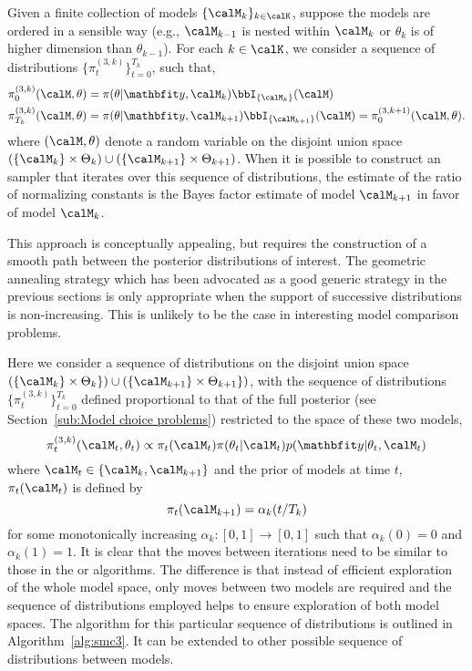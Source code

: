 Given a finite collection of models $\{\calM_k\}_{k\in\calK}$, suppose the models are ordered in a sensible way (e.g., $\calM_{k-1}$ is nested within $\calM_k$ or $\theta_k$ is of higher dimension than $\theta_{k-1}$). For each $k\in\calK$, we consider a sequence of distributions $\{\pi_t^{(3,k)}\}_{t=0}^{T_k}$, such that,
\begin{align*}
  \pi_0^{(3,k)}(\calM,\theta) &=
  \pi(\theta|\data,\calM_k) \bbI_{\{\calM_k\}}(\calM) \\
  \pi_{T_k}^{(3,k)}(\calM,\theta) &=
  \pi(\theta|\data,\calM_{k+1})
  \bbI_{\{\calM_{k+1}\}}(\calM) = \pi_{0}^{(3,k+1)}(\calM,\theta).
\end{align*}
where $(\calM,\theta)$ denote a random variable on the disjoint union space $(\{\calM_k\}\times\Theta_k)\cup(\{\calM_{k+1}\}\times\Theta_{k+1})$. When it is possible to construct an \smc sampler that iterates over this sequence of distributions, the estimate of the ratio of normalizing constants is the Bayes factor estimate of model $\calM_{k+1}$ in favor of model $\calM_k$.

This approach is conceptually appealing, but requires the construction of a smooth path between the posterior distributions of interest. The geometric annealing strategy which has been advocated as a good generic strategy in the previous sections is only appropriate when the support of successive distributions is non-increasing. This is unlikely to be the case in interesting model comparison problems.

Here we consider a sequence of distributions on the disjoint union space $(\{\calM_k\}\times\Theta_k\})\cup(\{\calM_{k+1}\}\times\Theta_{k+1}\})$, with the sequence of distributions $\{\pi_t^{(3,k)}\}_{t=0}^{T_k}$ defined proportional to that of the full posterior (see Section~\ref{sub:Model choice problems}) restricted to the space of these two models,
\begin{equation}
  \pi_t^{(3,k)}(\calM_t,\theta_t) \propto
  \pi_t(\calM_t) \pi(\theta_t|\calM_t) p(\data|\theta_t,\calM_t)
\end{equation}
where $\calM_t\in\{\calM_k,\calM_{k+1}\}$ and the prior of models at time $t$, $\pi_t(\calM_t)$ is defined by
\begin{equation}
  \pi_t(\calM_{k+1}) = \alpha_k(t/T_k)
  \label{eq:smc3_prior}
\end{equation}
for some monotonically increasing $\alpha_k:[0,1]\to[0,1]$ such that $\alpha_k(0) = 0$ and $\alpha_k(1) = 1$. It is clear that the \mcmc moves between iterations need to be similar to those in the \rjmcmc or \smc[1] algorithms. The difference is that instead of efficient exploration of the whole model space, only moves between two models are required and the sequence of distributions employed helps to ensure exploration of both model spaces. The algorithm for this particular sequence of distributions is outlined in Algorithm~\ref{alg:smc3}. It can be extended to other possible sequence of distributions between models.

